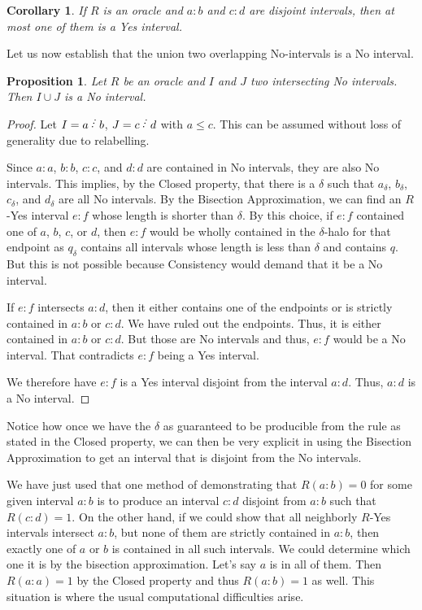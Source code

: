 \documentclass[12pt]{article}
\newtheorem{corollary}{Corollary}[subsection]
\newtheorem{proposition}{Proposition}[subsection]
\begin{document}
\begin{corollary}\label{cor:disjoint}
    If $R$ is an oracle and $a:b$ and $c:d$ are disjoint intervals, then at most one of them is a Yes interval. 
\end{corollary}


Let us now establish that the union two overlapping No-intervals is a No interval. 

\begin{proposition}\label{pr:union}
Let $R$ be an oracle and $I$ and $J$ two intersecting No intervals. Then $I \cup J$ is a No interval. 
\end{proposition}

\begin{proof}
    Let $I = a\lte b$, $J = c\lte d$ with $a \leq c$. This can be assumed without loss of generality due to relabelling. 
    
    Since $a:a$, $b:b$, $c:c$, and $d:d$ are contained in No intervals, they are also No intervals. This implies, by the Closed property, that there is a $\delta$ such that $a_\delta$, $b_\delta$, $c_\delta$, and $d_\delta$ are all No intervals. By the Bisection Approximation, we can find an $R$-Yes interval $e:f$ whose length is shorter than $\delta$. By this choice, if $e:f$ contained one of $a$, $b$, $c$, or $d$, then $e:f$ would be wholly contained in the $\delta$-halo for that endpoint as $q_\delta$ contains all intervals whose length is less than $\delta$ and contains $q$.  But this is not possible because Consistency would demand that it be a No interval.  
    
    If $e:f$ intersects $a:d$, then it either contains one of the endpoints or is strictly contained in $a:b$ or $c:d$. We have ruled out the endpoints. Thus, it is either contained in $a:b$ or $c:d$. But those are No intervals and thus, $e:f$ would be a No interval. That contradicts $e:f$ being a Yes interval. 

    We therefore have $e:f$ is a Yes interval disjoint from the interval $a:d$. Thus, $a:d$ is a No interval. 

\end{proof}

Notice how once we have the $\delta$ as guaranteed to be producible from the rule as stated in the Closed property, we can then be very explicit in using the Bisection Approximation to get an interval that is disjoint from the No intervals. 


We have just used that one method of demonstrating that $R(a:b)=0$ for some given interval $a:b$ is to produce an interval $c:d$ disjoint from $a:b$ such that $R(c:d)=1$. On the other hand, if we could show that all neighborly $R$-Yes intervals intersect $a:b$, but none of them are strictly contained in $a:b$, then exactly one of $a$ or $b$ is contained in all such intervals. We could determine which one it is by the bisection approximation. Let's say $a$ is in all of them. Then $R(a:a)=1$ by the Closed property and thus $R(a:b)=1$ as well. This situation is where the usual computational difficulties arise. 
\end{document}
